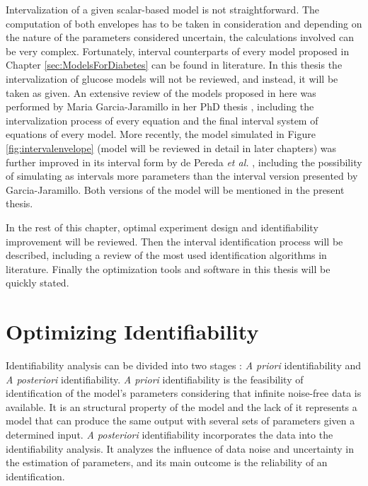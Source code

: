 Intervalization of a given scalar-based model is not straightforward. The computation of both envelopes has to be taken in consideration and depending on the nature of the parameters considered uncertain, the calculations involved can be very complex. Fortunately, interval counterparts of every model proposed in Chapter \ref{sec:ModelsForDiabetes} can be found in literature. In this thesis the intervalization of glucose models will not be reviewed, and instead, it will be taken as given. An extensive review of the models proposed in here was performed by Maria Garcia-Jaramillo in her PhD thesis \cite{mairathesis}, including the intervalization process of every equation and the final interval system of equations of every model. More recently, the model simulated in Figure \ref{fig:intervalenvelope} (model will be reviewed in detail in later chapters) was further improved in its interval form by de Pereda \textit{et al.} \cite{de2012prediction}, including the possibility of simulating as intervals more parameters than the interval version presented by Garcia-Jaramillo. Both versions of the model will be mentioned in the present thesis.

In the rest of this chapter, optimal experiment design and identifiability improvement will be reviewed. Then the interval identification process will be described, including a review of the most used identification algorithms in literature. Finally the optimization tools and software in this thesis will be quickly stated.

\section{Optimizing Identifiability}
\label{sec:Optimizationofidentifiability}

Identifiability analysis can be divided into two stages \cite{walter1997}: \textit{A priori} identifiability and \textit{A posteriori} identifiability. \textit{A priori} identifiability is the feasibility of identification of the model's parameters considering that infinite noise-free data is available. It is an structural property of the model and the lack of it represents a model that can produce the same output with several sets of parameters given a determined input. \textit{A posteriori} identifiability incorporates the data into the identifiability analysis. It analyzes the influence of data noise and uncertainty in the estimation of parameters, and its main outcome is the reliability of an identification.

